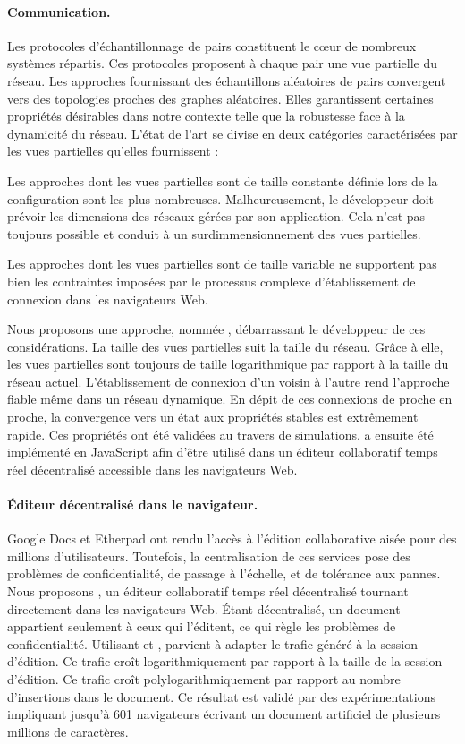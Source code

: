 \paragraph{Communication.} Les protocoles d'échantillonnage de pairs constituent
le cœur de nombreux systèmes répartis. Ces protocoles proposent à chaque pair
une vue partielle du réseau. Les approches fournissant des échantillons
aléatoires de pairs convergent vers des topologies proches des graphes
aléatoires. Elles garantissent certaines propriétés désirables dans notre
contexte telle que la robustesse face à la dynamicité du réseau.  L'état de
l'art se divise en deux catégories caractérisées par les vues partielles
qu'elles fournissent :
\begin{inparaenum}[(i)]
\item Les approches dont les vues partielles sont de taille constante définie
  lors de la configuration sont les plus nombreuses. Malheureusement, le
  développeur doit prévoir les dimensions des réseaux gérées par son
  application. Cela n'est pas toujours possible et conduit à un
  surdimmensionnement des vues partielles.
\item Les approches dont les vues partielles sont de taille variable ne
  supportent pas bien les contraintes imposées par le processus complexe
  d'établissement de connexion dans les navigateurs Web.
\end{inparaenum}
Nous proposons une approche, nommée \SPRAY, débarrassant le développeur de ces
considérations. La taille des vues partielles suit la taille du réseau. Grâce à
elle, les vues partielles sont toujours de taille logarithmique par rapport à la
taille du réseau actuel. L'établissement de connexion d'un voisin à l'autre
rend l'approche fiable même dans un réseau dynamique. En dépit de ces connexions
de proche en proche, la convergence vers un état aux propriétés stables est
extrêmement rapide. Ces propriétés ont été validées au travers de
simulations. \SPRAY a ensuite été implémenté en JavaScript afin d'être utilisé
dans un éditeur collaboratif temps réel décentralisé accessible dans les
navigateurs Web.

\paragraph{Éditeur décentralisé dans le navigateur.} Google Docs et Etherpad ont
rendu l'accès à l'édition collaborative aisée pour des millions
d'utilisateurs. Toutefois, la centralisation de ces services pose des problèmes
de confidentialité, de passage à l'échelle, et de tolérance aux pannes. Nous
proposons \CRATE, un éditeur collaboratif temps réel décentralisé tournant
directement dans les navigateurs Web. Étant décentralisé, un document appartient
seulement à ceux qui l'éditent, ce qui règle les problèmes de
confidentialité. Utilisant \SPRAY et \LSEQ, \CRATE parvient à adapter le trafic
généré à la session d'édition. Ce trafic croît logarithmiquement par rapport à
la taille de la session d'édition. Ce trafic croît polylogarithmiquement par
rapport au nombre d'insertions dans le document. Ce résultat est validé par des
expérimentations impliquant jusqu'à 601 navigateurs écrivant un document
artificiel de plusieurs millions de caractères.

